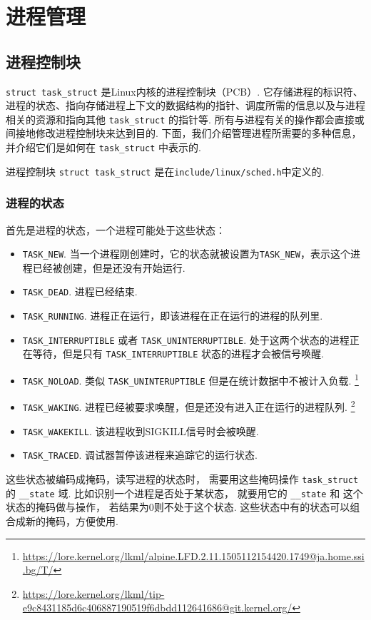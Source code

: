 \section{进程管理}

\subsection{进程控制块}
\lstinline{struct task_struct} 是Linux内核的进程控制块（PCB）.
它存储进程的标识符、进程的状态、指向存储进程上下文的数据结构的指针、调度所需的信息以及与进程相关的资源和指向其他 \lstinline{task_struct} 的指针等.
所有与进程有关的操作都会直接或间接地修改进程控制块来达到目的.
下面，我们介绍管理进程所需要的多种信息，并介绍它们是如何在 \lstinline{task_struct} 中表示的.

\begin{readsrcbox}{进程控制块}
	\lstinline{struct task_struct} 是在\lstinline{include/linux/sched.h}中定义的.
\end{readsrcbox}

\subsubsection{进程的状态}
首先是进程的状态，一个进程可能处于这些状态：
\begin{itemize}
	\item \lstinline{TASK_NEW}.
	      当一个进程刚创建时，它的状态就被设置为\lstinline{TASK_NEW}，表示这个进程已经被创建，但是还没有开始运行.
	\item \lstinline{TASK_DEAD}.
	      进程已经结束.
	\item \lstinline{TASK_RUNNING}.
	      进程正在运行，即该进程在正在运行的进程的队列里.
	\item \lstinline{TASK_INTERRUPTIBLE} 或者 \lstinline{TASK_UNINTERRUPTIBLE}.
	      处于这两个状态的进程正在等待，但是只有 \lstinline{TASK_INTERRUPTIBLE} 状态的进程才会被信号唤醒.
	\item \lstinline{TASK_NOLOAD}.
	      类似 \lstinline{TASK_UNINTERUPTIBLE} 但是在统计数据中不被计入负载.
	      \footnote{\url{https://lore.kernel.org/lkml/alpine.LFD.2.11.1505112154420.1749@ja.home.ssi.bg/T/}}
	\item \lstinline{TASK_WAKING}.
	      进程已经被要求唤醒，但是还没有进入正在运行的进程队列.
	      \footnote{\url{https://lore.kernel.org/lkml/tip-e9c8431185d6c406887190519f6dbdd112641686@git.kernel.org/}}
	\item \lstinline{TASK_WAKEKILL}.
	      该进程收到SIGKILL信号时会被唤醒.
	\item \lstinline{TASK_TRACED}.
	      调试器暂停该进程来追踪它的运行状态.
\end{itemize}
这些状态被编码成掩码，读写进程的状态时，
需要用这些掩码操作 \lstinline{task_struct} 的 \lstinline{__state} 域.
比如识别一个进程是否处于某状态，
就要用它的 \lstinline{__state} 和 这个状态的掩码做与操作，
若结果为0则不处于这个状态.
这些状态中有的状态可以组合成新的掩码，方便使用.

